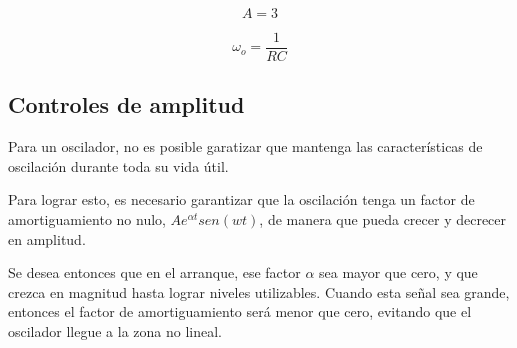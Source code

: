 \begin{equation}
  A = 3
  \label{eq:ganancia-oscilador-wien}
\end{equation}

\begin{equation}
  \omega_o = \frac{1}{RC}
  \label{eq:frecuancia-corte-oscilador-wien}
\end{equation}

\subsection{Controles de amplitud}

Para un oscilador, no es posible garatizar que mantenga las características
de oscilación durante toda su vida útil.

Para lograr esto, es necesario garantizar que la oscilación tenga un factor
de amortiguamiento no nulo, $A e^{\alpha t}sen(wt)$, de manera que pueda crecer y decrecer en amplitud.

Se desea entonces que en el arranque, ese factor $\alpha$ sea mayor que cero, y que crezca en magnitud hasta lograr niveles utilizables. Cuando esta señal sea grande, entonces el factor de amortiguamiento será menor que cero, evitando que el oscilador llegue a la zona no lineal.